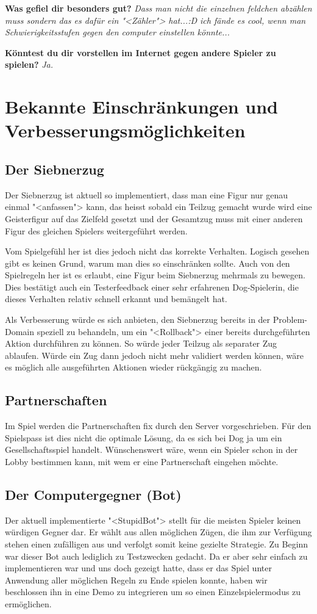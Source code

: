 \documentclass[12pt,halfparskip]{scrartcl}
\begin{document}
\textbf{Was gefiel dir besonders gut?}
\emph{Dass man nicht die einzelnen feldchen abzählen muss sondern das es dafür ein "<Zähler"> hat...:D ich fände es cool, wenn man Schwierigkeitsstufen gegen den computer einstellen könnte...}

\textbf{Könntest du dir vorstellen im Internet gegen andere Spieler zu spielen?}
\emph{Ja.}

\section{Bekannte Einschränkungen und Verbesserungsmöglichkeiten}
\subsection{Der Siebnerzug}
Der Siebnerzug ist aktuell so implementiert, dass man eine Figur nur genau einmal "<anfassen"> kann, das heisst sobald ein Teilzug gemacht wurde wird eine Geisterfigur auf das Zielfeld gesetzt und der Gesamtzug muss mit einer anderen Figur des gleichen Spielers weitergeführt werden.

Vom Spielgefühl her ist dies jedoch nicht das korrekte Verhalten. Logisch gesehen gibt es keinen Grund, warum man dies so einschränken sollte. Auch von den Spielregeln her ist es erlaubt, eine Figur beim Siebnerzug mehrmals zu bewegen. Dies bestätigt auch ein Testerfeedback einer sehr erfahrenen Dog-Spielerin, die dieses Verhalten relativ schnell erkannt und bemängelt hat.

Als Verbesserung würde es sich anbieten, den Siebnerzug bereits in der Problem-Domain speziell zu behandeln, um ein "<Rollback"> einer bereits durchgeführten Aktion durchführen zu können. So würde jeder Teilzug als separater Zug ablaufen. Würde ein Zug dann jedoch nicht mehr validiert werden können, wäre es möglich alle ausgeführten Aktionen wieder rückgängig zu machen.

\subsection{Partnerschaften}
Im Spiel werden die Partnerschaften fix durch den Server vorgeschrieben. Für den Spielspass ist dies nicht die optimale Lösung, da es sich bei Dog ja um ein Gesellschaftsspiel handelt. Wünschenswert wäre, wenn ein Spieler schon in der Lobby bestimmen kann, mit wem er eine Partnerschaft eingehen möchte.

\subsection{Der Computergegner (Bot)}
Der aktuell implementierte "<StupidBot"> stellt für die meisten Spieler keinen würdigen Gegner dar. Er wählt aus allen möglichen Zügen, die ihm zur Verfügung stehen einen zufälligen aus und verfolgt somit keine gezielte Strategie. Zu Beginn war dieser Bot auch lediglich zu Testzwecken gedacht. Da er aber sehr einfach zu implementieren war und uns doch gezeigt hatte, dass er das Spiel unter Anwendung aller möglichen Regeln zu Ende spielen konnte, haben wir beschlossen ihn in eine Demo zu integrieren um so einen Einzelspielermodus zu ermöglichen.
\end{document}

